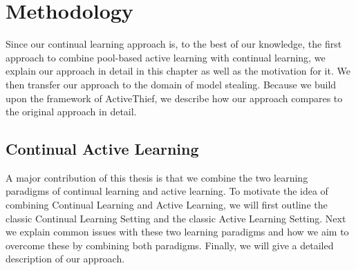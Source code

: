 
\chapter{Methodology}
\label{ch:Methodolody}

Since our continual learning approach is, to the best of our knowledge, the first approach to combine pool-based active learning with continual
learning, we explain our approach in detail in this chapter as well as the motivation for it. We then transfer our approach to the domain of model
stealing. Because we build upon the framework of ActiveThief, we describe how our approach compares to the original approach in detail.

\section{Continual Active Learning}
\label{sec:Methodology:ContinualActiveLearning}
A major contribution of this thesis is that we combine the two learning paradigms of continual learning and active learning. To motivate the idea of
combining Continual Learning and Active Learning, we will first outline the classic Continual Learning Setting and the classic Active Learning Setting.
Next we explain common issues with these two learning paradigms and how we aim to overcome these by combining both paradigms. Finally, we will give
a detailed description of our approach. 

